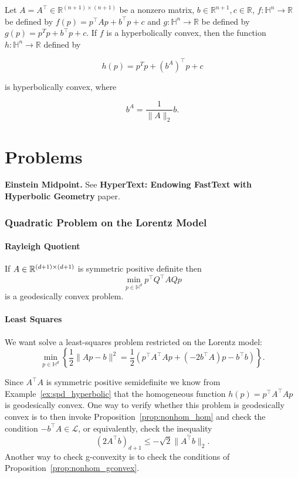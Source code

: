 \documentclass[twoside,11pt]{article}
\begin{document}
\begin{prop}
Let $A=A^{\top} \in \mathbb{R}^{(n+1) \times(n+1)}$ be a nonzero matrix, $b \in \mathbb{R}^{n+1}, c \in \mathbb{R}$, $f: \mathbb{H}^n \rightarrow \mathbb{R}$ be defined by $f(p)=p^{\top} A p+b^{\top} p+c$ and $g: \mathbb{H}^n \rightarrow \mathbb{R}$ be defined by $g(p)=p^T p+b^{\top} p+c$. If $f$ is a hyperbolically convex, then the function $h: \mathbb{H}^n \rightarrow \mathbb{R}$ defined by

$$
h(p)=p^T p+\left(b^A\right)^{\top} p+c
$$

is hyperbolically convex, where

$$
b^A=\frac{1}{\|A\|_2} b .
$$

\end{prop}

\newpage
\section{Problems}
\textbf{Einstein Midpoint.} See \textbf{HyperText: Endowing FastText with Hyperbolic Geometry} paper.


\subsubsection{Quadratic Problem on the Lorentz Model}

\paragraph{Rayleigh Quotient}

If $A \in \mathbb{R}^{(d+1) \times (d+1)}$ is symmetric positive definite then
    \[
    \min_{p \in \mathbb{H}^d} p^\top Q^\top A Qp
    \]
    is a geodesically convex problem.

\paragraph{Least Squares}
We want solve a least-squares problem restricted on the Lorentz model: 
\[
\min_{p \in \mathbb{H}^d} \left\{\frac{1}{2}\|Ap - b\|^2 = \frac{1}{2}\left(p^\top A^\top A p +  \left(-2b^\top A\right) p - b^\top b \right) \right\}.
\]

Since $A^\top A $ is symmetric positive semidefinite we know from Example~\ref{ex:spd_hyperbolic} that the homogeneous function $h(p) = p^\top A^\top A p$ is geodesically convex. One way to verify whether this problem is geodesically convex is to then invoke Proposition~\ref{prop:nonhom_hom} and check the condition $-b^\top A \in \mathscr{L}$, or equivalently, check the inequality
\[ \left(2A^\top b\right)_{d+1} \leq - \sqrt{2}\| \overline{A^\top b}\|_2.
\]
Another way to check g-convexity is to check the conditions of Proposition~\ref{prop:nonhom_gconvex}. 
    
\end{document}
